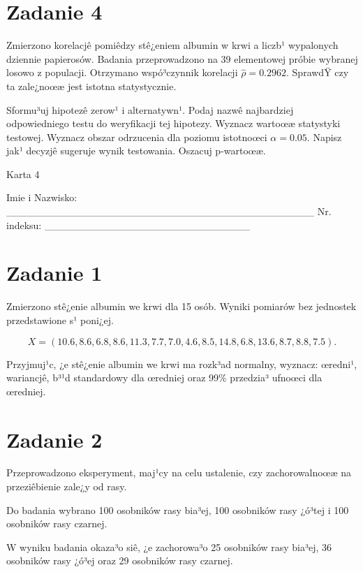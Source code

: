 \documentclass[a4paper,12pt]{article}
\begin{document}
  \section*{Zadanie 4}
     
     Zmierzono korelacjê pomiêdzy stê¿eniem albumin w krwi a liczb¹ wypalonych dziennie papierosów. 
     Badania przeprowadzono na 39 elementowej próbie wybranej losowo z populacji. 
     Otrzymano wspó³czynnik korelacji $\hat\rho = 0.2962 $. 
     SprawdŸ czy ta zale¿noœæ jest istotna statystycznie. 
     
     Sformu³uj hipotezê zerow¹ i alternatywn¹. 
     Podaj nazwê najbardziej odpowiedniego testu do weryfikacji tej hipotezy. 
     Wyznacz wartoœæ statystyki testowej. 
     Wyznacz obszar odrzucenia dla poziomu istotnoœci $\alpha=0.05$. 
     Napisz jak¹ decyzjê sugeruje wynik testowania. 
     Oszacuj p-wartoœæ. \vspace{1cm} 

  \clearpage  Karta  4  

 Imie i Nazwisko: \_\_\_\_\_\_\_\_\_\_\_\_\_\_\_\_\_\_\_\_\_\_\_\_\_\_\_\_\_\_\_\_\_\_\_\_\_\_\_\_\_\_ Nr. indeksu: \_\_\_\_\_\_\_\_\_\_\_\_\_\_\_\_\_\_\_\_\_\_\_\_\_\_\_\_ 
 \section*{Zadanie 1}
     
     Zmierzono stê¿enie albumin we krwi dla 15 osób. 
     Wyniki pomiarów bez jednostek przedstawione s¹ poni¿ej. 
     
     \noindent $$X=( 10.6,  8.6,  6.8,  8.6, 11.3,  7.7,  7.0,  4.6,  8.5, 14.8,  6.8, 13.6,  8.7,  8.8,  7.5 ).$$
     
     Przyjmuj¹c, ¿e stê¿enie albumin we krwi ma rozk³ad normalny, 
     wyznacz: œredni¹, wariancjê, b³¹d standardowy dla œredniej oraz 99\% przedzia³ ufnoœci dla œredniej. \vspace{1cm} 

  \section*{Zadanie 2}
     
  Przeprowadzono eksperyment, maj¹cy na celu ustalenie, czy zachorowalnoœæ na przeziêbienie zale¿y od rasy.
  
  Do badania wybrano 100 osobników rasy bia³ej, 100 osobników rasy ¿ó³tej i 100 osobników rasy czarnej. 
  
  W wyniku badania okaza³o siê, ¿e zachorowa³o 25 osobników rasy bia³ej, 36 osobników rasy ¿ó³ej oraz 29 osobników rasy czarnej. 
  
\end{document}
